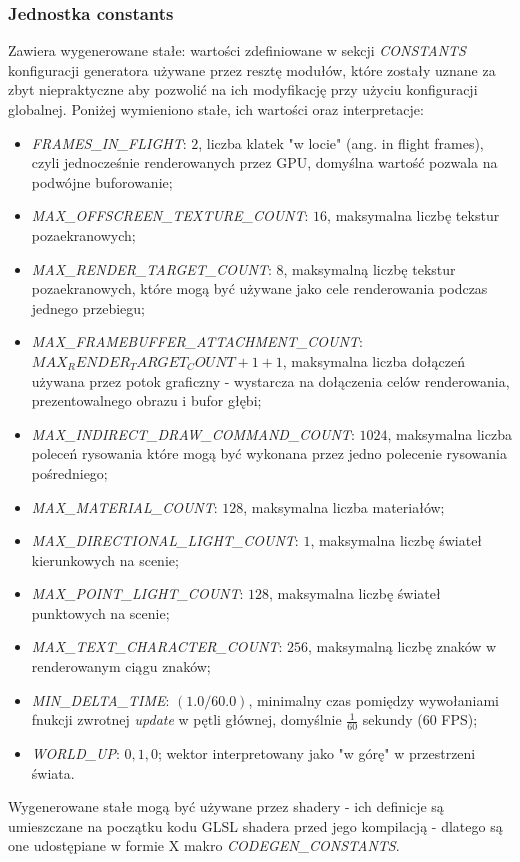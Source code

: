 \subsubsection{Jednostka constants}
Zawiera wygenerowane stałe: wartości zdefiniowane w sekcji \textit{CONSTANTS} konfiguracji generatora używane przez resztę modułów, które zostały uznane za zbyt niepraktyczne aby pozwolić na ich modyfikację przy użyciu konfiguracji globalnej.
Poniżej wymieniono stałe, ich wartości oraz interpretacje:
\begin{itemize}
	\item \textit{FRAMES\_IN\_FLIGHT}: $2$, liczba klatek "w locie" (ang. in flight frames), czyli jednocześnie renderowanych przez GPU, domyślna wartość pozwala na podwójne buforowanie; 
	\item \textit{MAX\_OFFSCREEN\_TEXTURE\_COUNT}: $16$, maksymalna liczbę tekstur pozaekranowych;
	\item \textit{MAX\_RENDER\_TARGET\_COUNT}: $8$, maksymalną liczbę tekstur pozaekranowych, które mogą być używane jako cele renderowania podczas jednego przebiegu; 
	\item \textit{MAX\_FRAMEBUFFER\_ATTACHMENT\_COUNT}: $MAX_RENDER_TARGET_COUNT + 1 + 1$, maksymalna liczba dołączeń używana przez potok graficzny - wystarcza na dołączenia celów renderowania, prezentowalnego obrazu i bufor głębi;
	\item \textit{MAX\_INDIRECT\_DRAW\_COMMAND\_COUNT}: $1024$, maksymalna liczba poleceń rysowania które mogą być wykonana przez jedno polecenie rysowania pośredniego;
	\item \textit{MAX\_MATERIAL\_COUNT}: $128$, maksymalna liczba materiałów;
	\item \textit{MAX\_DIRECTIONAL\_LIGHT\_COUNT}: $1$, maksymalna liczbę świateł kierunkowych na scenie;
	\item \textit{MAX\_POINT\_LIGHT\_COUNT}: $128$, maksymalna liczbę świateł punktowych na scenie;
	\item \textit{MAX\_TEXT\_CHARACTER\_COUNT}: $256$, maksymalną liczbę znaków w renderowanym ciągu znaków;
	\item \textit{MIN\_DELTA\_TIME}: $(1.0 / 60.0)$, minimalny czas pomiędzy wywołaniami fnukcji zwrotnej \textit{update} w pętli głównej, domyślnie $\frac{1}{60}$ sekundy (60 FPS);
	\item \textit{WORLD\_UP}: $0, 1, 0$; wektor interpretowany jako "w górę" w przestrzeni świata.
\end{itemize}

Wygenerowane stałe mogą być używane przez shadery - ich definicje są umieszczane na początku kodu GLSL shadera przed jego kompilacją - dlatego są one udostępiane w formie X makro \textit{CODEGEN\_CONSTANTS}.

